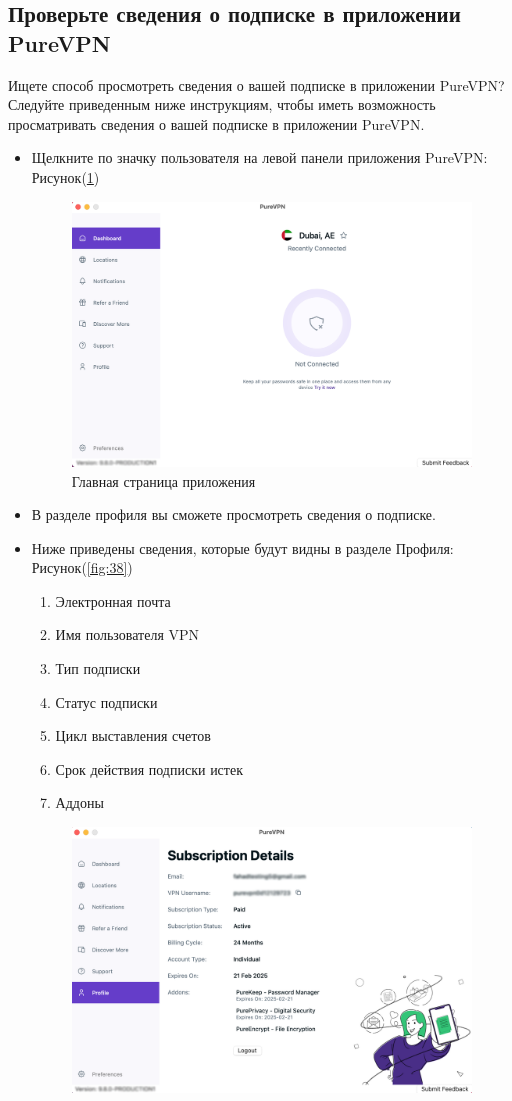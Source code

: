 \subsection{Проверьте сведения о подписке в приложении PureVPN} 
Ищете способ просмотреть сведения о вашей подписке в приложении PureVPN? Следуйте приведенным ниже инструкциям, чтобы иметь возможность просматривать сведения о вашей подписке в приложении PureVPN.
\begin{itemize}
\item Щелкните по значку пользователя на левой панели приложения PureVPN:  Рисунок(\ref{fig:37})
\begin{figure}[H]
\includegraphics[width=12cm]{28.png}
\centering
\caption{Главная страница приложения}
\label{fig:37}
\end{figure}
\item В разделе профиля вы сможете просмотреть сведения о подписке.
\item Ниже приведены сведения, которые будут видны в разделе Профиля:  Рисунок(\ref{fig:38})
\begin{enumerate}
\item Электронная почта
\item Имя пользователя VPN
\item Тип подписки
\item Статус подписки
\item Цикл выставления счетов
\item Срок действия подписки истек
\item Аддоны
\end{enumerate}
\begin{figure}[H]
\includegraphics[width=12cm]{29.png}

\end{figure}
\end{itemize}
